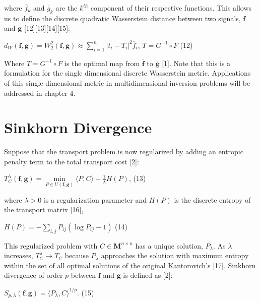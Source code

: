 \documentclass[botnum, fleqn]{unmeethesis}
\begin{document}
where $\overline{f}_k$ and $\overline{g}_k$ are the $k^{th}$ component of their respective functions. This allows us to define the discrete quadratic Wasserstein distance between two signals, $\bm{f}$ and $\bm{g}$ [12][13][14][15]:

\hspace{\fill}$d_W(\bm{f},\bm{g})=W_2^2(\bm{f},\bm{g})\approx\sum_{i=1}^{n}|t_i-T_i|^2\overline{f}_i$, \hspace{1cm} $T=G^{-1}\circ F$\hspace{\fill} \normalsize (12)

Where $T=G^{-1}\circ F$ is the optimal map from $\overline{\bm{f}}$ to $\overline{\bm{g}}$ [1]. Note that this is a formulation for the single dimensional discrete Wasserstein metric. Applications of this single dimensional metric in multidimensional inversion problems will be addressed in chapter 4. \\
 
\section{\label{section:Sinkhorn Divergence}Sinkhorn Divergence}
Suppose that the transport problem is now regularized by adding an entropic penalty term to the total transport cost [2]:

\hspace{\fill} \normalsize $T^\lambda_C(\bm{f},\bm{g})=\min\limits_{P\in U(\bm{f},\bm{g})}\langle P,C \rangle-\frac{1}{\lambda}H(P)$,\hspace{\fill} \normalsize (13)

where $\lambda>0$ is a regularization parameter and $H(P)$  is the discrete entropy of the transport matrix [16],

\hspace{\fill}$H(P)=-\sum\limits_{i,j}P_{ij}(\log P_{ij}-1)$\hspace{\fill} \normalsize (14)

This regularized problem with $C\in \bm{M}^{n\times n}$ has a unique solution, $P_\lambda$. As $\lambda$ increases, $T_C^\lambda \rightarrow T_C$ because $P_\lambda$ approaches the solution with maximum entropy within the set of all optimal solutions of the original Kantorovich’s [17]. Sinkhorn divergence of order $p$ between $\bm{f}$ and $\bm{g}$ is defined as [2]:

\hspace{\fill}$S_{p,\lambda}(\bm{f},\bm{g})=\langle P_\lambda,C \rangle ^{1/p}$.\hspace{\fill} \normalsize (15)
\end{document}
